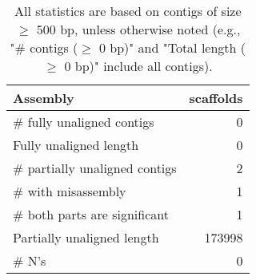 \documentclass[12pt,a4paper]{article}
\begin{document}
\begin{table}[ht]
\begin{center}
\caption{All statistics are based on contigs of size $\geq$ 500 bp, unless otherwise noted (e.g., "\# contigs ($\geq$ 0 bp)" and "Total length ($\geq$ 0 bp)" include all contigs).}
\begin{tabular}{|l*{1}{|r}|}
\hline
Assembly & scaffolds \\ \hline
\# fully unaligned contigs & 0 \\ \hline
Fully unaligned length & 0 \\ \hline
\# partially unaligned contigs & 2 \\ \hline
\hspace{5mm}\# with misassembly & 1 \\ \hline
\hspace{5mm}\# both parts are significant & 1 \\ \hline
Partially unaligned length & 173998 \\ \hline
\# N's & 0 \\ \hline
\end{tabular}
\end{center}
\end{table}
\end{document}
